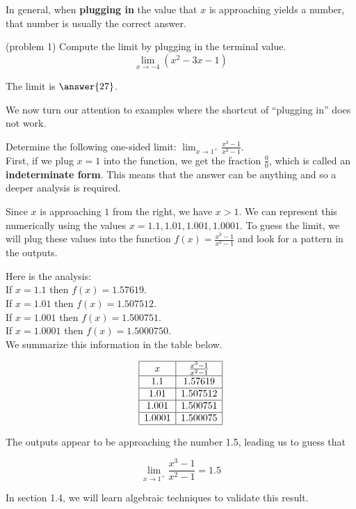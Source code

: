 \documentclass[handout]{ximera}
\begin{document}
In general, when \textbf{plugging in} the value that $x$ is approaching yields a number, 
that number is usually the correct answer.  



\begin{problem}(problem 1)
Compute the limit by plugging in the terminal value.
\[
\lim_{x \to -4} (x^2 -3x -1)
\]

The limit is $\answer{27}$.
\end{problem}

We now turn our attention to examples where the shortcut of ``plugging in'' does not work.

\begin{example}[example 2]
Determine the following one-sided limit: $\displaystyle \lim_{x \to 1^{+}} \frac{x^3 - 1}{x^2 -1}.$\\
First, if we plug $x = 1$ into the function, we get the fraction  $\displaystyle \frac00$, which is called an \textbf{indeterminate form}. 
This means that the answer can be anything and so a deeper analysis is required.

Since $x$ is approaching $1$ from the right, we have $x > 1$. 
We can represent this numerically using the values $x =1.1, 1.01, 1.001, 1.0001$. 
To guess the limit, we will plug these values into the function $f(x) =\frac{x^3 - 1}{x^2-1}$ and  
look for a pattern in the outputs.

Here is the analysis:\\
If $x = 1.1$ then $f(x) = 1.57619$.\\
If $x = 1.01$ then $f(x) = 1.507512$.\\
If $x = 1.001$ then $f(x)= 1.500751$.\\
If $x = 1.0001$ then $f(x) = 1.5000750$.\\

We summarize this information in the table below.
  
\[
\begin{array}{|c | c|}
	\hline
  x & \frac{x^3 - 1}{x^2-1} \\
	\hline
	1.1 & 1.57619 \\
	\hline
	1.01 & 1.507512 \\
	\hline
	1.001 & 1.500751 \\
	\hline
	1.0001 & 1.500075 \\
	\hline
\end{array}
\]

The outputs appear to be approaching the number 1.5, leading us to guess that

\[\lim_{x \to 1^+} \frac{x^3 - 1}{x^2-1} = 1.5\] 
 
 In section 1.4, we will learn algebraic techniques to validate this result.
\end{example}
\end{document}
